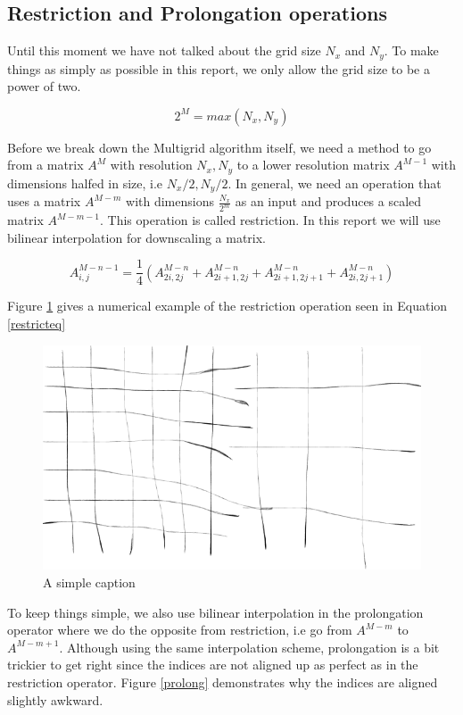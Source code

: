 \subsection{Restriction and Prolongation operations}

Until this moment we have not talked about the grid size $N_x$ and $N_y$. To make things as simply as possible in this report, we only allow the grid size to be a power of two.

\begin{equation}
2^M = max(N_x, N_y)
\end{equation}

Before we break down the Multigrid algorithm itself, we need a method to go from a matrix $A^M$ with resolution $N_x,N_y$ to a lower resolution matrix $A^{M-1}$ with dimensions halfed in size, i.e $N_x/2,N_y/2$. In general, we need an operation that uses a matrix $A^{M-m}$ with dimensions $\frac{N_x}{2^m}$ as an input and produces a scaled matrix $A^{M-m-1}$. This operation is called restriction. In this report we will use bilinear interpolation for downscaling a matrix.

\begin{equation}
A^{M-n-1}_{i,j} = \frac{1}{4} ( A^{M-n}_{2i,2j} + A^{M-n}_{2i + 1,2j} + A^{M-n}_{2i + 1,2j +1 }  + A^{M-n}_{2i,2j + 1} )
\label{restricteq}
\end{equation}

Figure \ref {restrict} gives a numerical example of the restriction operation seen in Equation \ref{restricteq}

\begin{figure}[ht!]
\centering
\includegraphics[width=120mm]{img/restrict.png}
\caption{A simple caption}
\label{restrict}
\end{figure}

To keep things simple, we also use bilinear interpolation in the prolongation operator where we do the opposite from restriction, i.e go from $A^{M-m}$ to $A^{M-m+1}$. Although using the same interpolation scheme, prolongation is a bit trickier to get right since the indices are not aligned up as perfect as in the restriction operator. Figure \ref {prolong} demonstrates why the indices are aligned slightly awkward.

